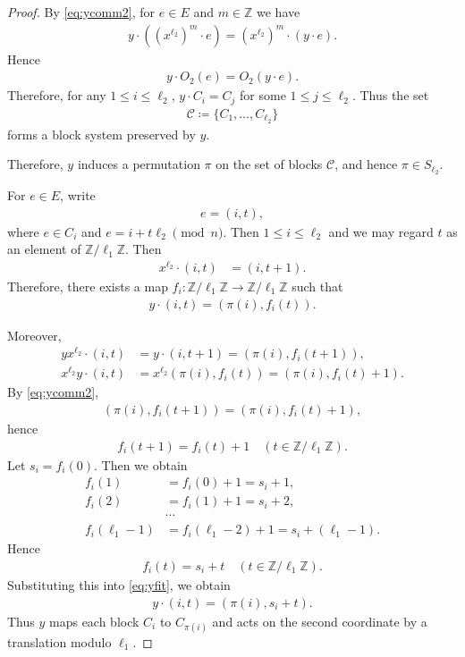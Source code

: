 \documentclass[12pt,reqno]{amsart}
\newcommand{\mcC}{\mathcal{C}}
\newcommand{\Z}{\mathbb{Z}}								%
\newcommand{\q}{\quad}									%
\newcommand{\ceq}{\coloneqq} 							%
\theoremstyle{mythmstyle}
\theoremstyle{mydefstyle}
\numberwithin{equation}{section}
\begin{document}
\begin{proof}
By \eqref{eq:ycomm2}, for $e \in E$ and $m \in \Z$ we have
\begin{align}
y\cdot((x^{\ell_2})^m\cdot e) = (x^{\ell_2})^m\cdot(y\cdot e).
\end{align}
Hence
\begin{align}
y\cdot O_{2}(e) = O_{2}(y \cdot e).
\end{align}
Therefore, for any $1 \le i \le \ell_{2}$, $y\cdot C_{i} = C_{j}$ for some $1 \le j \le \ell_{2}$.
Thus the set
\begin{align}
\mcC \ceq \{C_1,\dots, C_{\ell_2}\}
\end{align}
forms a block system preserved by $y$.

Therefore, $y$ induces a permutation $\pi$ on the set of blocks $\mcC$, and hence
$\pi \in S_{\ell_{2}}$.

For $e \in E$, write
\begin{align}
e = (i, t),
\end{align}
where $e \in C_{i}$ and $e = i + t\ell_{2} \pmod{n}$. Then $1 \le i \le \ell_{2}$ and
we may regard $t$ as an element of $\Z/\ell_1\Z$.
Then
\begin{align}
x^{\ell_{2}}\cdot(i, t) &= (i, t+1).
\end{align}
Therefore, there exists a map $f_{i}: \Z/\ell_1\Z \to \Z/\ell_1\Z$ such that
\begin{align}
\label{eq:yfit}
y\cdot(i,t)=(\pi(i),f_i(t)).
\end{align}

Moreover,
\begin{align}
yx^{\ell_{2}}\cdot(i, t) &= y\cdot(i,t+1) = (\pi(i), f_{i}(t+1)), \\
x^{\ell_{2}}y\cdot(i, t) &= x^{\ell_{2}}(\pi(i), f_{i}(t)) = (\pi(i), f_{i}(t)+1).
\end{align}
By \eqref{eq:ycomm2},
\begin{align}
(\pi(i), f_{i}(t+1)) = (\pi(i), f_{i}(t)+1),
\end{align}
hence
\begin{align}
f_{i}(t+1) = f_{i}(t)+1\q(t \in \Z/\ell_{1}\Z).
\end{align}
Let $s_{i} = f_{i}(0)$. Then we obtain
\begin{align}
f_{i}(1) &= f_{i}(0)+1 = s_{i} + 1, \\
f_{i}(2) &= f_{i}(1)+1 = s_{i} + 2, \\
&\cdots \\
f_{i}(\ell_{1}-1) &= f_{i}(\ell_{1}-2)+1 = s_{i} + (\ell_{1}-1).
\end{align}
Hence
\begin{align}
f_{i}(t) = s_{i} + t \q (t \in \Z/\ell_{1}\Z).
\end{align}
Substituting this into \eqref{eq:yfit}, we obtain
\begin{align}
\label{eq:ypi}
y\cdot(i, t) = (\pi(i), s_{i}+t).
\end{align}
Thus $y$ maps each block $C_i$ to $C_{\pi(i)}$ and acts on the second coordinate
by a translation modulo $\ell_1$.


\end{proof}
\end{document}
